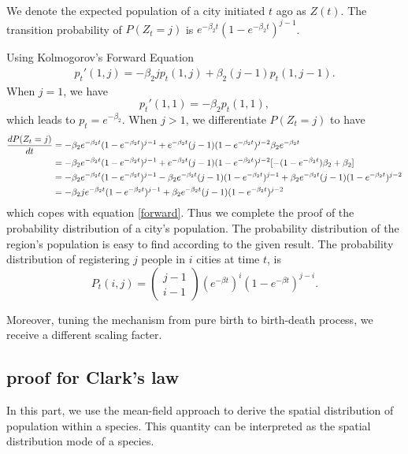 \documentclass[aps,prl]{revtex4-2}
\begin{document}
We denote the expected population of a city initiated $t$ ago as $Z(t)$. The transition probability of $P(Z_t = j)$ is $e^{-\beta_2 t}(1-e^{-\beta_2 t})^{j-1}$. 

Using Kolmogorov’s Forward Equation
\begin{align}p_t'(1,j) = -\beta_2 j p_t(1,j) + \beta_2 (j-1) p_t(1,j-1).\label{forward}\end{align}  When $j = 1$, we have \[p_t'(1,1) = -\beta_2 p_t(1,1), \] which leads to $p_t=e^{-\beta_2}$. When $j>1$, we differentiate $P(Z_t = j)$ to have 
\begin{align}
	\frac{dP(Z_t = j)}{dt} &= -\beta_2e^{-\beta_2 t} (1-e^{-\beta_2 t})^{j-1} + e^{-\beta_2 t}(j-1)(1-e^{-\beta_2 t})^{j-2}\beta_2 e^{-\beta_2 t}\notag\\
	&= -\beta_2 e^{-\beta_2 t}(1-e^{-\beta_2 t})^{j-1} + e^{-\beta_2 t}(j-1)(1-e^{-\beta_2 t})^{j-2} [-(1-e^{-\beta_2 t})\beta_2+\beta_2]\notag\\
	&= -\beta_2 e^{-\beta_2 t}(1-e^{-\beta_2 t})^{j-1} -\beta_2 e^{-\beta_2 t}(j-1)(1-e^{-\beta_2 t})^{j-1} +\beta_2e^{-\beta_2 t}(j-1)(1-e^{-\beta_2 t})^{j-2}\notag\\
	&= -\beta_2 j e^{-\beta_2 t}(1-e^{-\beta_2 t})^{j-1} +\beta_2e^{-\beta_2 t}(j-1)(1-e^{-\beta_2 t})^{j-2}
\end{align}
which copes with equation \ref{forward}. Thus we complete the proof of the probability distribution of a city's population. The probability distribution of the region's population is easy to find according to the given result. The probability distribution of registering $j$ people in $i$ cities at time $t$, is \[ P_t(i,j) = \left(\begin{array}{c}{j-1} \\ {i-1}\end{array}\right)\left(e^{-\beta t}\right)^{i}\left(1-e^{-\beta t}\right)^{j-i}. \]

Moreover, tuning the mechanism from pure birth to birth-death process, we receive a different scaling facter.

\subsection{proof for Clark's law}

In this part, we use the mean-field approach to derive the spatial distribution of population within a species. This quantity can be interpreted as the spatial distribution mode of a species. 
\end{document}
